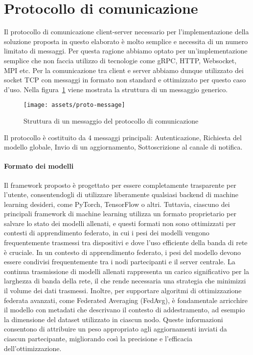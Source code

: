 \documentclass[a4paper, oneside, openright]{report}
\let\oldsection\section
\renewcommand{\section}{\newpage\oldsection}
\begin{document}
\section{Protocollo di comunicazione}
Il protocollo di comunicazione client-server necessario per l'implementazione della soluzione proposta in questo elaborato è molto semplice e necessita di un numero limitato di messaggi. Per questa ragione abbiamo optato per un'implementazione semplice che non faccia utilizzo di tecnologie come gRPC, HTTP, Websocket, MPI etc. Per la comunicazione tra client e server abbiamo dunque utilizzato dei socket TCP con messaggi in formato non standard e ottimizzato per questo caso d'uso. Nella figura~\ref{fig:proto-message} viene mostrata la struttura di un messaggio generico.
\begin{figure}[h] 
\centering
\texttt{[image: assets/proto-message]}
\caption{Struttura di un messaggio del protocollo di comunicazione}\label{fig:proto-message}
\end{figure}

Il protocollo è costituito da 4 messaggi principali: Autenticazione, Richiesta del modello globale, Invio di un aggiornamento, Sottoscrizione al canale di notifica.

\paragraph{Formato dei modelli}
Il framework proposto è progettato per essere completamente trasparente per l'utente, consentendogli di utilizzare liberamente qualsiasi backend di machine learning desideri, come PyTorch, TensorFlow o altri. Tuttavia, ciascuno dei principali framework di machine learning utilizza un formato proprietario per salvare lo stato dei modelli allenati, e questi formati non sono ottimizzati per contesti di apprendimento federato, in cui i pesi dei modelli vengono frequentemente trasmessi tra dispositivi e dove l'uso efficiente della banda di rete è cruciale. In un contesto di apprendimento federato, i pesi del modello devono essere condivisi frequentemente tra i nodi partecipanti e il server centrale. La continua trasmissione di modelli allenati rappresenta un carico significativo per la larghezza di banda della rete, il che rende necessaria una strategia che minimizzi il volume dei dati trasmessi. Inoltre, per supportare algoritmi di ottimizzazione federata avanzati, come Federated Averaging (FedAvg), è fondamentale arricchire il modello con metadati che descrivano il contesto di addestramento, ad esempio la dimensione del dataset utilizzato in ciascun nodo. Queste informazioni consentono di attribuire un peso appropriato agli aggiornamenti inviati da ciascun partecipante, migliorando così la precisione e l'efficacia dell’ottimizzazione.
\end{document}
